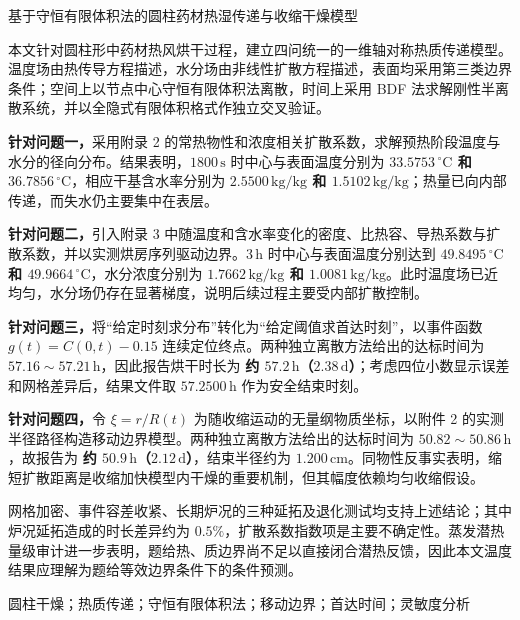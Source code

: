 \documentclass[UTF8,a4paper,zihao=-4,fontset=fandol]{ctexart}
\newcommand{\unit}[1]{\,\mathrm{#1}}
\begin{document}
\thispagestyle{empty}
\begin{center}
  {\heiti{} 基于守恒有限体积法的圆柱药材热湿传递与收缩干燥模型}
\end{center}

\vspace{0.8em}
本文针对圆柱形中药材热风烘干过程，建立四问统一的一维轴对称热质传递模型。温度场由热传导方程描述，水分场由非线性扩散方程描述，表面均采用第三类边界条件；空间上以节点中心守恒有限体积法离散，时间上采用 BDF 法求解刚性半离散系统，并以全隐式有限体积格式作独立交叉验证。

\textbf{针对问题一，}采用附录 2 的常热物性和浓度相关扩散系数，求解预热阶段温度与水分的径向分布。结果表明，$1800\unit{s}$ 时中心与表面温度分别为 \textbf{$33.5753\,^{\circ}\mathrm{C}$ 和 $36.7856\,^{\circ}\mathrm{C}$}，相应干基含水率分别为 \textbf{$2.5500\unit{kg/kg}$ 和 $1.5102\unit{kg/kg}$}；热量已向内部传递，而失水仍主要集中在表层。

\textbf{针对问题二，}引入附录 3 中随温度和含水率变化的密度、比热容、导热系数与扩散系数，并以实测烘房序列驱动边界。$3\unit{h}$ 时中心与表面温度分别达到 \textbf{$49.8495\,^{\circ}\mathrm{C}$ 和 $49.9664\,^{\circ}\mathrm{C}$}，水分浓度分别为 \textbf{$1.7662\unit{kg/kg}$ 和 $1.0081\unit{kg/kg}$}。此时温度场已近均匀，水分场仍存在显著梯度，说明后续过程主要受内部扩散控制。

\textbf{针对问题三，}将“给定时刻求分布”转化为“给定阈值求首达时刻”，以事件函数 $g(t)=C(0,t)-0.15$ 连续定位终点。两种独立离散方法给出的达标时间为 $57.16\sim57.21\unit{h}$，因此报告烘干时长为 \textbf{约 $57.2\unit{h}$（$2.38\unit{d}$）}；考虑四位小数显示误差和网格差异后，结果文件取 $57.2500\unit{h}$ 作为安全结束时刻。

\textbf{针对问题四，}令 $\xi=r/R(t)$ 为随收缩运动的无量纲物质坐标，以附件 2 的实测半径路径构造移动边界模型。两种独立离散方法给出的达标时间为 $50.82\sim50.86\unit{h}$，故报告为 \textbf{约 $50.9\unit{h}$（$2.12\unit{d}$）}，结束半径约为 \textbf{$1.200\unit{cm}$}。同物性反事实表明，缩短扩散距离是收缩加快模型内干燥的重要机制，但其幅度依赖均匀收缩假设。

网格加密、事件容差收紧、长期炉况的三种延拓及退化测试均支持上述结论；其中炉况延拓造成的时长差异约为 $0.5\%$，扩散系数指数项是主要不确定性。蒸发潜热量级审计进一步表明，题给热、质边界尚不足以直接闭合潜热反馈，因此本文温度结果应理解为题给等效边界条件下的条件预测。

\vspace{0.6em}
圆柱干燥；热质传递；守恒有限体积法；移动边界；首达时间；灵敏度分析
\end{document}

